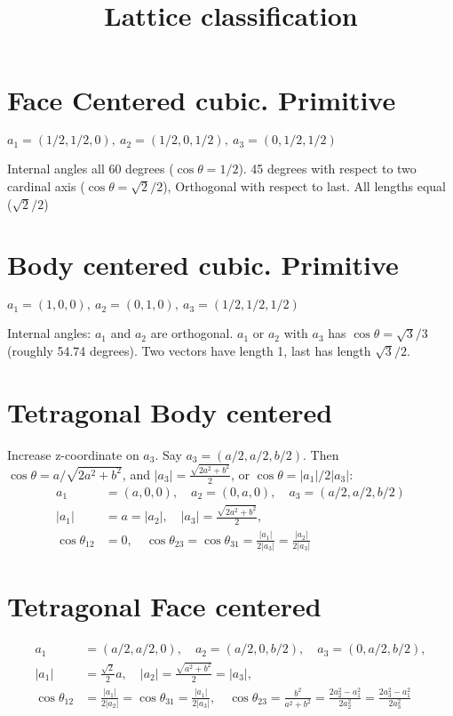 \documentclass[a4paper,10pt]{article} 	%
\title{Lattice classification}
\author{}
\date{}
\numberwithin{equation}{section}
\begin{document}
	\maketitle

	\section{Face Centered cubic. Primitive}
	$a_1 = (1/2, 1/2, 0),\ a_2 = (1/2, 0, 1/2),\ a_3 = (0, 1/2, 1/2)$
	
	Internal angles all 60 degrees ($\cos \theta = 1/2$). 45 degrees with respect to two cardinal axis ($\cos \theta = \sqrt{2}/2$), Orthogonal with respect to last. All lengths equal ($\sqrt{2}/2$)
	
	\section{Body centered cubic. Primitive}
	$ a_1 = (1,0,0),\ a_2 = (0,1,0),\ a_3 = (1/2,1/2,1/2) $
	
	Internal angles: $a_1$ and $a_2$ are orthogonal. $a_1$ or $a_2$ with $a_3$ has $\cos \theta = \sqrt{3}/3 $ (roughly 54.74 degrees). Two vectors have length 1, last has length $\sqrt{3}/2$.
	
	\section{Tetragonal Body centered}
	Increase z-coordinate on $a_3$. Say $a_3 = (a/2,a/2,b/2) $. Then $\cos \theta = a/\sqrt{2a^2+b^2} $, and $|a_3| = \frac{\sqrt{2a^2+b^2}}{2}$, or $ \cos \theta = |a_1|/2|a_3|$:
	\begin{align}
		a_1 &= (a,0,0), \quad a_2 = (0,a,0), \quad a_3 = (a/2,a/2,b/2) \\
		|a_1| &= a = |a_2|, \quad |a_3| = \frac{\sqrt{2a^2+b^2}}{2}, \\
		\cos \theta_{12} &= 0, \quad \cos \theta_{23} = \cos \theta_{31} = \frac{|a_1|}{2|a_3|}  = \frac{|a_2|}{2 |a_3|}
	\end{align}
	
	\section{Tetragonal Face centered}
	\begin{align}
		a_1 &= (a/2,a/2,0), \quad a_2 = (a/2,0,b/2), \quad a_3 = (0,a/2,b/2),\\
		|a_1| &= \frac{\sqrt{2}}{2} a, \quad |a_2| = \frac{\sqrt{a^2+b^2}}{2} = |a_3|, \\
		\cos \theta_{12} & = \frac{|a_1|}{2|a_2|} = \cos \theta_{31} = \frac{|a_1|}{2 |a_3|}, \quad \cos \theta_{23} = \frac{b^2}{a^2+b^2} = \frac{2a_2^2 - a_1^2}{2a_2^2} = \frac{2a_3^2 - a_1^2}{2a_3^2}
	\end{align}
\end{document}
